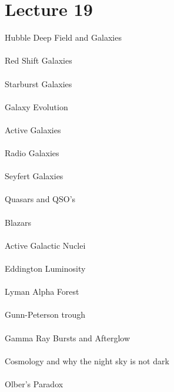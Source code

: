 \documentclass[11pt,reqno]{article}
\theoremstyle{definition}
\begin{document}
\section*{Lecture 19}
Hubble Deep Field and Galaxies\\\\
Red Shift Galaxies\\\\
Starburst Galaxies\\\\
Galaxy Evolution\\\\
Active Galaxies\\\\
Radio Galaxies\\\\
Seyfert Galaxies\\\\
Quasars and QSO's\\\\
Blazars\\\\
Active Galactic Nuclei\\\\
Eddington Luminosity\\\\
Lyman Alpha Forest\\\\
Gunn-Peterson trough\\\\
Gamma Ray Bursts and Afterglow\\\\
Cosmology and why the night sky is not dark\\\\
Olber's Paradox\\\\
\end{document}
